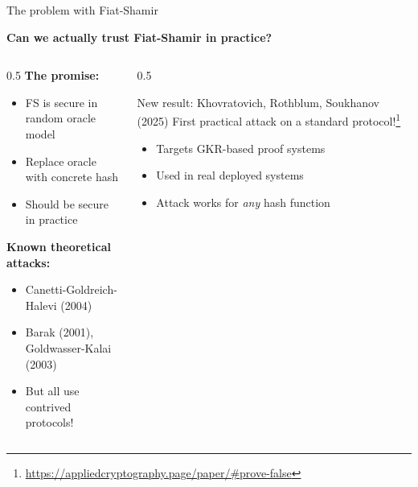 \ifdefined\PRESENTATION\else\PassOptionsToClass{handout}{beamer}\fi\documentclass[aspectratio=169, lualatex]{beamer}
\begin{document}
\begin{frame}{The problem with Fiat-Shamir}
	\begin{center}
		\textbf{Can we actually trust Fiat-Shamir in practice?}
	\end{center}
	\begin{columns}[c]
		\begin{column}{0.5\textwidth}
			\textbf{The promise:}
			\begin{itemize}
				\item FS is secure in random oracle model
				\item Replace oracle with concrete hash
				\item Should be secure in practice
			\end{itemize}
			\textbf{Known theoretical attacks:}
			\begin{itemize}
				\item Canetti-Goldreich-Halevi (2004)
				\item Barak (2001), Goldwasser-Kalai (2003)
				\item But all use contrived protocols!
			\end{itemize}
		\end{column}
		\begin{column}{0.5\textwidth}
			\begin{alertblock}{New result: Khovratovich, Rothblum, Soukhanov (2025)}
				First practical attack on a standard protocol!\footnote{\url{https://appliedcryptography.page/paper/\#prove-false}}
				\begin{itemize}
					\item Targets GKR-based proof systems
					\item Used in real deployed systems
					\item Attack works for \textit{any} hash function
				\end{itemize}
			\end{alertblock}
		\end{column}
	\end{columns}
\end{frame}
\end{document}
